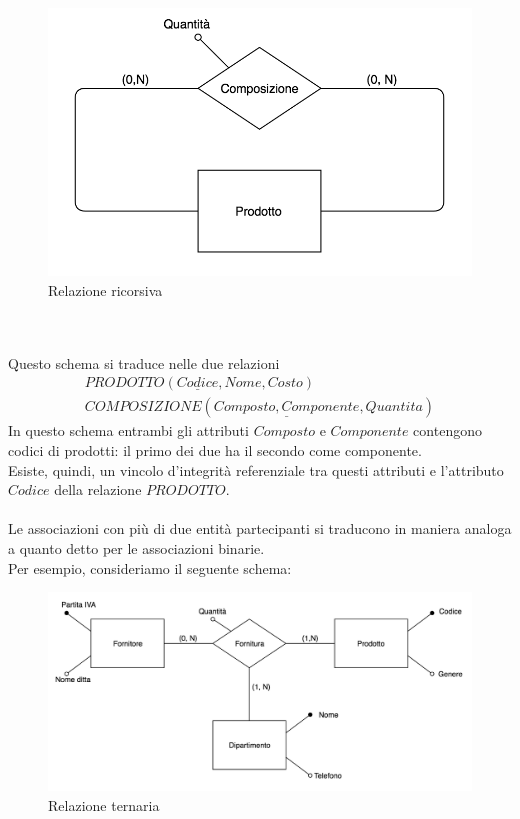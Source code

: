     \begin{figure}[h!]
        \centering
        \includegraphics[scale = 0.5]{15/img6}
        \caption{Relazione ricorsiva}
    \end{figure}\\\\
Questo schema si traduce nelle due relazioni
    \begin{equation}\begin{aligned}
        PRODOTTO(\underline{Codice}, Nome, Costo)\\
        COMPOSIZIONE(\underline{Composto, Componente}, Quantita)
    \end{aligned}\end{equation}
In questo schema entrambi gli attributi $Composto$ e $Componente$ contengono codici di prodotti: il primo dei due ha il secondo come componente.\\
Esiste, quindi, un vincolo d'integrità referenziale tra questi attributi e l'attributo $Codice$ della relazione $PRODOTTO$.\\\\
Le associazioni con più di due entità  partecipanti si traducono in maniera analoga a quanto detto per le associazioni binarie.\\
Per esempio, consideriamo il seguente schema:
    \begin{figure}[h!]
        \centering
        \includegraphics[scale = 0.5]{15/img7}
        \caption{Relazione ternaria}
    \end{figure}\\\\
